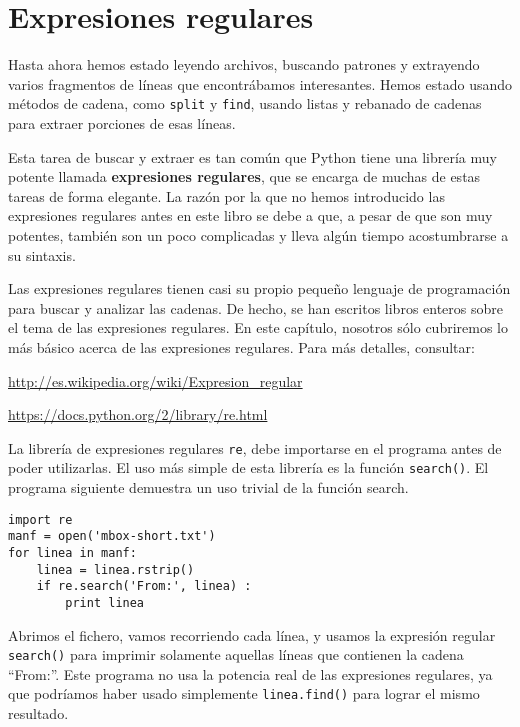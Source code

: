 
\chapter{Expresiones regulares}

Hasta ahora hemos estado leyendo archivos, buscando patrones y extrayendo varios
fragmentos de líneas que encontrábamos interesantes. Hemos estado usando métodos de cadena, como {\tt split}
y {\tt find}, usando listas y rebanado de cadenas para extraer porciones de esas líneas.

Esta tarea de buscar y extraer es tan común que Python tiene una librería muy potente
llamada {\bf expresiones regulares}, que se encarga de muchas de estas tareas de forma elegante. La
razón por la que no hemos introducido las expresiones regulares antes en este libro se debe a que,
a pesar de que son muy potentes, también son un poco complicadas y lleva algún tiempo acostumbrarse a su
sintaxis.

Las expresiones regulares tienen casi su propio pequeño lenguaje de programación para buscar y analizar
las cadenas. De hecho, se han escritos libros enteros sobre el tema de las expresiones regulares.
En este capítulo, nosotros sólo cubriremos lo más básico acerca de las expresiones regulares.
Para más detalles, consultar:

\url{http://es.wikipedia.org/wiki/Expresion_regular}

\url{https://docs.python.org/2/library/re.html}

La librería de expresiones regulares {\tt re}, debe importarse en el programa antes de poder utilizarlas.
El uso más simple de esta librería es la función {\tt search()}. El programa siguiente
demuestra un uso trivial de la función search.

\beforeverb
\begin{verbatim}
import re
manf = open('mbox-short.txt')
for linea in manf:
    linea = linea.rstrip()
    if re.search('From:', linea) :
        print linea
\end{verbatim}
\afterverb
%
Abrimos el fichero, vamos recorriendo cada línea, y usamos la expresión regular {\tt search()} para
imprimir solamente aquellas líneas que contienen la cadena ``From:''. Este programa no usa la potencia
real de las expresiones regulares, ya que podríamos haber usado simplemente {\tt linea.find()} para
lograr el mismo resultado.

